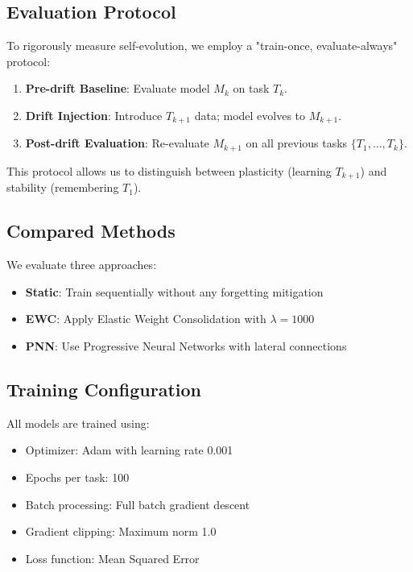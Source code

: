 \documentclass[journal,12pt,onecolumn]{IEEEtran}
\begin{document}
\subsection{Evaluation Protocol}

To rigorously measure self-evolution, we employ a "train-once, evaluate-always" protocol:
\begin{enumerate}
    \item \textbf{Pre-drift Baseline}: Evaluate model $M_k$ on task $T_k$.
    \item \textbf{Drift Injection}: Introduce $T_{k+1}$ data; model evolves to $M_{k+1}$.
    \item \textbf{Post-drift Evaluation}: Re-evaluate $M_{k+1}$ on all previous tasks $\{T_1, \dots, T_k\}$.
\end{enumerate}
This protocol allows us to distinguish between plasticity (learning $T_{k+1}$) and stability (remembering $T_1$).

\subsection{Compared Methods}

We evaluate three approaches:
\begin{itemize}
    \item \textbf{Static}: Train sequentially without any forgetting mitigation
    \item \textbf{EWC}: Apply Elastic Weight Consolidation with $\lambda = 1000$
    \item \textbf{PNN}: Use Progressive Neural Networks with lateral connections
\end{itemize}

\subsection{Training Configuration}

All models are trained using:
\begin{itemize}
    \item Optimizer: Adam with learning rate 0.001
    \item Epochs per task: 100
    \item Batch processing: Full batch gradient descent
    \item Gradient clipping: Maximum norm 1.0
    \item Loss function: Mean Squared Error
\end{itemize}
\end{document}
